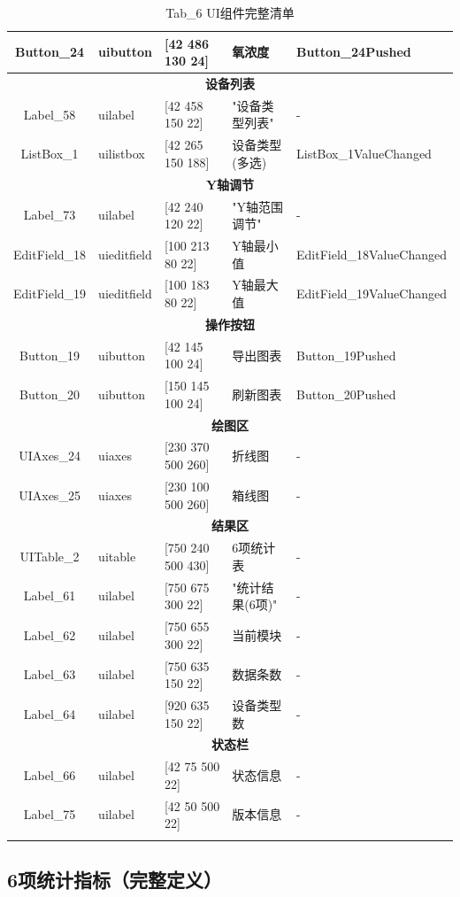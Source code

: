 \documentclass[12pt,a3paper]{ctexart}
\begin{document}
\begin{longtable}{c|l|l|l|l}
Button\_24 & uibutton & [42 486 130 24] & 氧浓度 & Button\_24Pushed \\
\hline
\multicolumn{5}{c}{\textbf{设备列表}} \\
\hline
Label\_58 & uilabel & [42 458 150 22] & "设备类型列表" & - \\
ListBox\_1 & uilistbox & [42 265 150 188] & 设备类型(多选) & ListBox\_1ValueChanged \\
\hline
\multicolumn{5}{c}{\textbf{Y轴调节}} \\
\hline
Label\_73 & uilabel & [42 240 120 22] & "Y轴范围调节" & - \\
EditField\_18 & uieditfield & [100 213 80 22] & Y轴最小值 & EditField\_18ValueChanged \\
EditField\_19 & uieditfield & [100 183 80 22] & Y轴最大值 & EditField\_19ValueChanged \\
\hline
\multicolumn{5}{c}{\textbf{操作按钮}} \\
\hline
Button\_19 & uibutton & [42 145 100 24] & 导出图表 & Button\_19Pushed \\
Button\_20 & uibutton & [150 145 100 24] & 刷新图表 & Button\_20Pushed \\
\hline
\multicolumn{5}{c}{\textbf{绘图区}} \\
\hline
UIAxes\_24 & uiaxes & [230 370 500 260] & 折线图 & - \\
UIAxes\_25 & uiaxes & [230 100 500 260] & 箱线图 & - \\
\hline
\multicolumn{5}{c}{\textbf{结果区}} \\
\hline
UITable\_2 & uitable & [750 240 500 430] & 6项统计表 & - \\
Label\_61 & uilabel & [750 675 300 22] & "统计结果(6项)" & - \\
Label\_62 & uilabel & [750 655 300 22] & 当前模块 & - \\
Label\_63 & uilabel & [750 635 150 22] & 数据条数 & - \\
Label\_64 & uilabel & [920 635 150 22] & 设备类型数 & - \\
\hline
\multicolumn{5}{c}{\textbf{状态栏}} \\
\hline
Label\_66 & uilabel & [42 75 500 22] & 状态信息 & - \\
Label\_75 & uilabel & [42 50 500 22] & 版本信息 & - \\
\bottomrule
\caption{Tab\_6 UI组件完整清单}
\end{longtable}

\subsection{6项统计指标（完整定义）}
\end{document}
